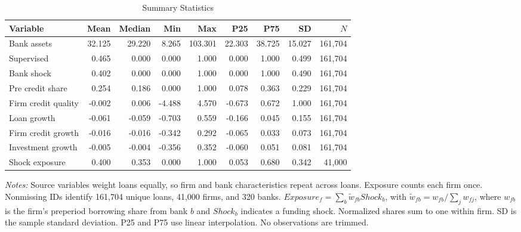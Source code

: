 \begin{table}[H]
\centering
\caption{Summary Statistics}
\label{tab:q1_summary}
\begingroup
\footnotesize
\setlength{\tabcolsep}{2pt}
\renewcommand{\arraystretch}{1.15}
\begin{tabular*}{\textwidth}{@{\extracolsep{\fill}}lrrrrrrrr@{}}
\toprule
Variable & Mean & Median & Min & Max & P25 & P75 & SD & $N$ \\
\midrule
Bank assets & 32.125 & 29.220 & 8.265 & 103.301 & 22.303 & 38.725 & 15.027 & 161,704 \\
Supervised & 0.465 & 0.000 & 0.000 & 1.000 & 0.000 & 1.000 & 0.499 & 161,704 \\
Bank shock & 0.402 & 0.000 & 0.000 & 1.000 & 0.000 & 1.000 & 0.490 & 161,704 \\
Pre credit share & 0.254 & 0.186 & 0.000 & 1.000 & 0.078 & 0.363 & 0.229 & 161,704 \\
Firm credit quality & -0.002 & 0.006 & -4.488 & 4.570 & -0.673 & 0.672 & 1.000 & 161,704 \\
Loan growth & -0.061 & -0.059 & -0.703 & 0.559 & -0.166 & 0.045 & 0.155 & 161,704 \\
Firm credit growth & -0.016 & -0.016 & -0.342 & 0.292 & -0.065 & 0.033 & 0.073 & 161,704 \\
Investment growth & -0.005 & -0.004 & -0.356 & 0.352 & -0.060 & 0.051 & 0.081 & 161,704 \\
Shock exposure & 0.400 & 0.353 & 0.000 & 1.000 & 0.053 & 0.680 & 0.342 & 41,000 \\
\bottomrule
\end{tabular*}
\par\smallskip
\begin{minipage}{\textwidth}\footnotesize
\textit{Notes:} Source variables weight loans equally, so firm and bank characteristics repeat across loans. Exposure counts each firm once. Nonmissing IDs identify 161,704 unique loans, 41,000 firms, and 320 banks. $Exposure_f=\sum_b\widetilde w_{fb}Shock_b$, with $\widetilde w_{fb}=w_{fb}/\sum_jw_{fj}$, where $w_{fb}$ is the firm's preperiod borrowing share from bank $b$ and $Shock_b$ indicates a funding shock. Normalized shares sum to one within firm. SD is the sample standard deviation. P25 and P75 use linear interpolation. No observations are trimmed.
\end{minipage}
\endgroup
\end{table}
